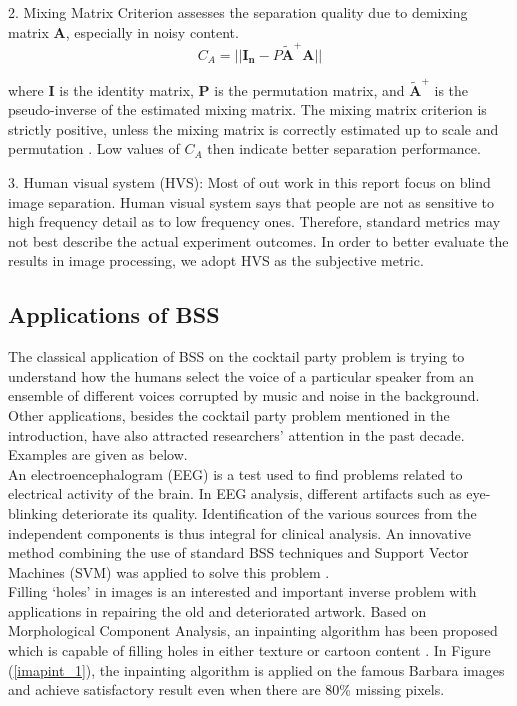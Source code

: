 2. Mixing Matrix Criterion assesses the separation quality due to demixing matrix $\mathbf{A}$, especially in noisy content.
\begin{equation}
    C_A = ||\mathbf{I_n} - P\tilde{\mathbf{A}}^{+}\mathbf{A} ||
\end{equation}

where $\mathbf{I}$ is the identity matrix, $\mathbf{P}$ is the permutation matrix, and $\tilde{\mathbf{A}}^{+}$ is the pseudo-inverse of the estimated mixing matrix. The mixing matrix criterion is strictly positive, unless the mixing matrix is correctly estimated up to scale and permutation \cite{VAbolghasemi2012}. Low values of $C_A$ then indicate better separation performance.
 
3. Human visual system (HVS): Most of out work in this report focus on blind image separation. Human visual system says that people are not as sensitive to high frequency detail as to low frequency ones. Therefore, standard metrics may not best describe the actual experiment outcomes. In order to better evaluate the results in image processing, we adopt HVS as the subjective metric.

\subsection{Applications of BSS}
The classical application of BSS on the cocktail party problem is trying to understand how the humans select the voice of a particular speaker from an ensemble of different voices corrupted by music and noise in the background. Other applications, besides the cocktail party problem mentioned in the introduction, have also attracted researchers' attention in the past decade. Examples are given as below. \\

An electroencephalogram (EEG) is a test used to find problems related to electrical activity of the brain. In EEG analysis, different artifacts such as eye-blinking deteriorate its quality. Identification of the various sources from the independent components is thus integral for clinical analysis. An innovative method combining the use of standard BSS techniques and Support Vector Machines (SVM) was applied to solve this problem  \cite{Duda2000PC954544}.\\

Filling `holes' in images is an interested and important inverse problem with applications in repairing the old and deteriorated artwork. Based on Morphological Component Analysis, an inpainting algorithm has been proposed  which is capable of filling holes in either texture or cartoon content \cite{ELAD2005340}. In Figure (\ref{imapint_1}), the inpainting algorithm is applied on the famous Barbara images and achieve satisfactory result even when there are 80\% missing pixels. \\

